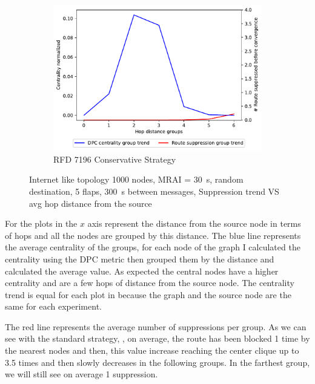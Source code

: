 \begin{figure}[h]
     \hfill
     \begin{subfigure}[b]{0.49\textwidth}
         \centering
         \includegraphics[width=\textwidth]{images/RFD/miceVSelephants/mice/cisco_1000_RFD_7196_conservative_nodeConvergence_centVSsup_trend.pdf}
         \caption{RFD 7196 Conservative Strategy}
         \label{fig:1000_7196RFDC_centVSsup}
     \end{subfigure}
		\caption{Internet like topology \num{1000} nodes, \ac{MRAI} = \SI{30}{\second},
		random destination, \num{5} flaps, \SI{300}{\second} between messages,
		Suppression trend VS avg hop distance from the source}
        \label{fig:1000_RFD_centVSsup}
\end{figure}

For the plots in  the $x$ axis represent the distance
from the source node in terms of hops and all the nodes are grouped by this
distance.
The blue line represents the average centrality of the groups, for each node of the
graph I calculated the centrality using the \ac{DPC} metric then grouped them
by the distance and calculated the average value.
As expected the central nodes have a higher centrality and are a few hops
of distance from the source node.
The centrality trend is equal for each plot in 
because the graph and the source node are the same for each experiment.

The red line represents the average number of suppressions per group.
As we can see with the standard strategy, ,
on average, the route has been blocked \num{1} time by the nearest nodes and then,
this value increase reaching the center clique up to \num{3.5} times and then
slowly decreases in the following groups.
In the farthest group, we will still see on average \num{1} suppression.


